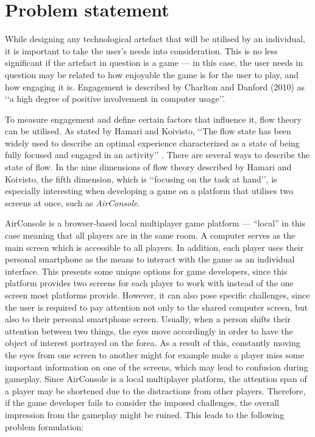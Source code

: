 \chapter{Problem statement}\label{ch:problem}
While designing any technological artefact that will be utilised by an individual, it is important to take the user's needs into consideration. This is no less significant if the artefact in question is a game --- in this case, the user needs in question may be related to how enjoyable the game is for the user to play, and how engaging it is. Engagement is described by Charlton and Danford (2010) \cite{Charlton2010} as ‘‘a high degree of positive involvement in computer usage’’. 

To measure engagement and define certain factors that influence it, flow theory can be utilised. As stated by Hamari and Koivisto, ‘‘The flow state has been widely used to describe an optimal experience characterized as a state of being fully focused and engaged in an activity’’ \cite{Hamari2014}. There are several ways to describe the state of flow. In the nine dimensions of flow theory described by Hamari and Koivisto, the fifth dimension, which is ‘‘focusing on the task at hand’’, is especially interesting when developing a game on a platform that utilises two screens at once, such as \textit{AirConsole}.

AirConsole is a browser-based local multiplayer game platform --- “local” in this case meaning that all players are in the same room. A computer serves as the main screen which is accessible to all players. In addition, each player uses their personal smartphone as the means to interact with the game as an individual interface. This presents some unique options for game developers, since this platform provides two screens for each player to work with instead of the one screen most platforms provide. However, it can also pose specific challenges, since the user is required to pay attention not only to the shared computer screen, but also to their personal smartphone screen. Usually, when a person shifts their attention between two things, the eyes move accordingly in order to have the object of interest portrayed on the forea. As a result of this, constantly moving the eyes from one screen to another might for example make a player miss some important information on one of the screens, which may lead to confusion during gameplay. Since AirConsole is a local multiplayer platform, the attention span of a player may be shortened due to the distractions from other players. Therefore, if the game developer fails to consider the imposed challenges, the overall impression from the gameplay might be ruined. This leads to the following problem formulation:

